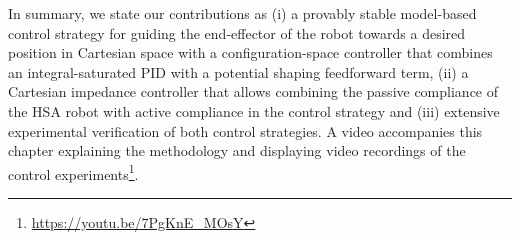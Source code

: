 In summary, we state our contributions as (i) a provably stable model-based control strategy for guiding the end-effector of the robot towards a desired position in Cartesian space with a configuration-space controller that combines an integral-saturated PID with a potential shaping feedforward term, (ii) a Cartesian impedance controller that allows combining the passive compliance of the \gls{HSA} robot with active compliance in the control strategy and (iii) extensive experimental verification of both control strategies. 
A video accompanies this chapter explaining the methodology and displaying video recordings of the control experiments\footnote{\url{https://youtu.be/7PgKnE_MOsY}}.


%
